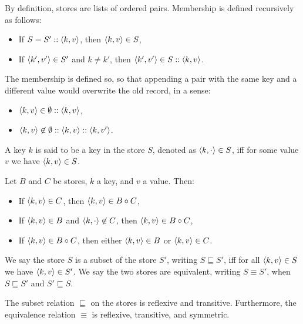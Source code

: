 \begin{definition}[Membership]
\label{defn:generic-context-membership}
By definition, stores are lists of ordered pairs. Membership is defined recursively as follows:
\begin{itemize}
    \item If $S = S' :: \langle k, v \rangle$, then $\langle k, v \rangle \in S$,
    \item If $\langle k', v' \rangle \in S'$ and $k \not= k'$, then $\langle k', v' \rangle \in S :: \langle k, v \rangle$.
\end{itemize}
\end{definition}

The membership is defined so, so that appending a pair with the same key and a different value would overwrite the old record, in a sense:
\begin{itemize}
    \item $\langle k, v \rangle \in \emptyset :: \langle k, v \rangle$,
    \item $\langle k, v \rangle \not\in \emptyset :: \langle k, v \rangle :: \left\langle k, v' \right\rangle$.
\end{itemize}

\begin{definition}
A key $k$ is said to be a key in the store $S$, denoted as $\left\langle k, \cdot \right\rangle \in S$, iff for some value $v$ we have $\langle k, v \rangle \in S$.
\end{definition}

\begin{lemma}
Let $B$ and $C$ be stores, $k$ a key, and $v$ a value. Then:
\begin{itemize}
    \item If $\langle k, v \rangle \in C$, then $\langle k, v \rangle \in B \circ C$,
    \item If $\langle k, v \rangle \in B$ and $\left\langle k, \cdot \right\rangle \not\in C$, then $\langle k, v \rangle \in B \circ C$,
    \item If $\langle k, v \rangle \in B \circ C$, then either $\langle k, v \rangle \in B$ or $\langle k, v \rangle \in C$.
\end{itemize}
\end{lemma}

\begin{definition}[Equivalence]
We say the store $S$ is a subset of the store $S'$, writing $S \sqsubseteq S'$, iff for all $\langle k, v \rangle \in S$ we have $\langle k, v \rangle \in S'$. We say the two stores are equivalent, writing $S \equiv S'$, when $S \sqsubseteq S'$ and $S' \sqsubseteq S$.
\end{definition}

\begin{lemma}
The subset relation $\sqsubseteq$ on the stores is reflexive and transitive. Furthermore, the equivalence relation $\equiv$ is reflexive, transitive, and symmetric.
\end{lemma}

